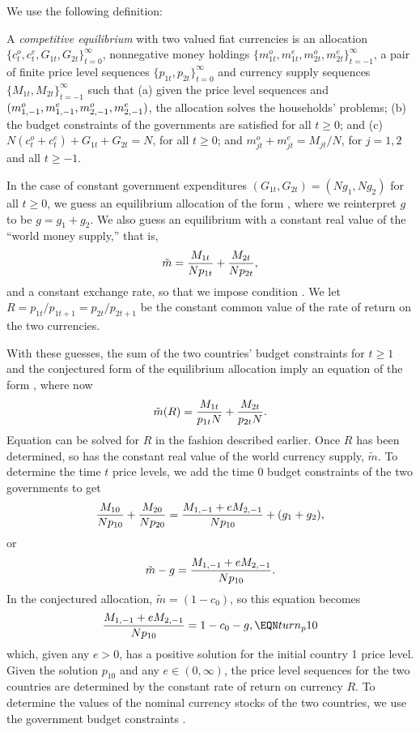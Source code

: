 We use the following definition:

\medskip
{} A {\it competitive equilibrium\/} with two valued
fiat currencies is an allocation $\{c_t^o, c_t^e, G_{1t},G_{2t}\}_{t=0}^\infty$,
nonnegative money holdings $\{m_{1t}^o, m_{1t}^e, m_{2t}^o, m_{2t}^e  \}_{t=-1}^\infty$,
a pair of finite
price level sequences $\{p_{1t},p_{2t}\}_{t=0}^\infty$ and
currency supply sequences $\{M_{1t}, M_{2t}\}_{t=-1}^\infty$
such that  %
(a)  given the price level sequences and
$(m^o_{1,-1},m^e_{1,-1}, \hfil\break m^o_{2,-1},m^e_{2,-1})$, the
allocation solves the households' problems;
(b) the budget constraints of the governments are satisfied for all $t \geq 0$; and
(c) $N(c^o_t+c^e_t)+G_{1t}+G_{2t}=N$, for all $t \geq 0$; and
$m^o_{jt}+m^e_{jt}=M_{jt}/N$, for $j=1,2$ and all $t \geq -1$.

\medskip

In the case of constant government expenditures $(G_{1t},G_{2t})=(N g_1, N g_2)$
for all $t\geq 0$,
we guess an equilibrium allocation of the  form
, where we reinterpret $g$ to be
$g=g_1+g_2$.
We also guess an equilibrium with a constant real value of the
``world money supply,'' that is,
$$ \tilde m = {M_{1t} \over N p_{1t}} + {M_{2t} \over N p_{2t}},$$
and a constant exchange rate, so that we impose condition .  We
let $R =p_{1t}/ p_{1t+1} = p_{2t}/ p_{2t+1}$
be the constant common value of the rate of return on the
two currencies.

   With these guesses, the sum of the two countries' budget
constraints  for $t \geq 1$ and the conjectured
form of the equilibrium allocation imply an
equation of the form ,
where now
$$ \tilde m(R) = {M_{1t} \over p_{1t} N} +{M_{2t} \over p_{2t} N }.$$
Equation  can be solved for $R$ in the  fashion described
earlier.  Once $R$ has been determined,
so has the constant real value of the world
currency supply, $\tilde m$.
 To determine the time $t$ price levels, we add the
time $0$ budget constraints of the two governments to get
$${M_{10} \over N p_{10}} + {M_{20} \over N p_{20}}
     = {M_{1,-1} + e M_{2,-1} \over N p_{10}} + (g_1+g_2) ,$$
or
$$ \tilde m - g = {M_{1,-1}+eM_{2,-1} \over N p_{10} }.$$
In the conjectured allocation, $\tilde m = (1-c_0)$,
so this equation becomes
$$ {M_{1,-1} + e M_{2,-1} \over N p_{10}} = 1 - c_0 - g ,    \EQN turn_p10$$
which, given any $e > 0$,
has a positive solution for the initial country 1 price
level. Given the solution $p_{10}$ and any $e \in (0,\infty)$,
the price level sequences  for the two countries are determined
by the constant rate of return on currency $R$.
To determine the values of the nominal currency stocks
of the two countries, we use the government budget constraints
.

